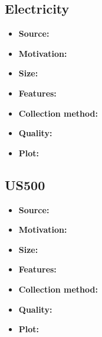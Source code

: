 \subsection{Electricity}
\begin{itemize}
	\item \textbf{Source:}
	\item \textbf{Motivation:}
	\item \textbf{Size:}
	\item \textbf{Features:}
	\item \textbf{Collection method:}
	\item \textbf{Quality:}
	\item \textbf{Plot:}
\end{itemize}
\subsection{US500}
\begin{itemize}
	\item \textbf{Source:}
	\item \textbf{Motivation:}
	\item \textbf{Size:}
	\item \textbf{Features:}
	\item \textbf{Collection method:}
	\item \textbf{Quality:}
	\item \textbf{Plot:}
\end{itemize}
